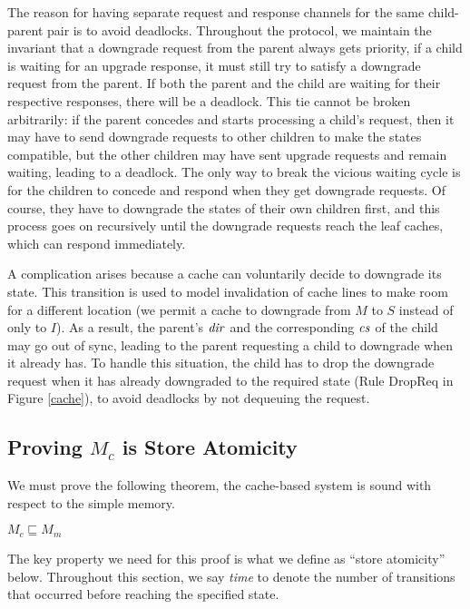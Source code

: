 The reason for having separate request and response channels for the same
child-parent pair is to avoid deadlocks. Throughout the protocol, we maintain
the invariant that a downgrade request from the parent always gets priority,
\ie{} if a child is waiting for an upgrade response, it must still try to
satisfy a downgrade request from the parent. If both the parent and the child
are waiting for their respective responses, there will be a deadlock. This tie
cannot be broken arbitrarily: if the parent concedes and starts processing a
child's request, then it may have to send downgrade requests to other children
to make the states compatible, but the other children may have sent upgrade
requests and remain waiting, leading to a deadlock. The only way to break the
vicious waiting cycle is for the children to concede and respond when they get
downgrade requests. Of course, they have to downgrade the states of their own
children first, and this process goes on recursively until the downgrade
requests reach the leaf caches, which can respond immediately.

A complication arises because a cache can voluntarily decide to downgrade its
state.  This transition is used to model invalidation of cache lines to make
room for a different location (we permit a cache to downgrade from $M$ to $S$
instead of only to $I$).
As a result, the parent's $\mathit{dir}$ and the
corresponding $\mathit{cs}$ of the child may go out of sync, leading to the parent
requesting a child to downgrade when it already has. To handle this situation,
the child has to drop the downgrade request when it has already downgraded to
the required state (Rule DropReq in Figure \ref{cache}), to avoid deadlocks
by not dequeuing the request.



\subsection{Proving $M_c$ is Store Atomicity}\label{sec:ccproof}
\label{safety}

We must prove the following theorem, \ie{} the cache-based system is sound with
respect to the simple memory.
\begin{theorem}
\label{ccorrect}
$M_c \sqsubseteq M_m$
\end{theorem}

The key property we need for this proof is what we define as
``store atomicity'' below. Throughout this section, we say
\emph{time} to denote the number of transitions that occurred before reaching
the specified state.

